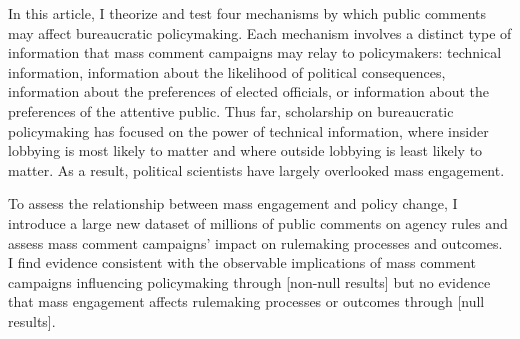 \documentclass{article}
\begin{document}
In this article, I theorize and test four mechanisms by which public comments may affect bureaucratic policymaking. Each mechanism involves a distinct type of information that mass comment campaigns may relay to policymakers: technical information, information about the likelihood of political consequences, information about the preferences of elected officials, or information about the preferences of the attentive public. Thus far, scholarship on bureaucratic policymaking has focused on the power of technical information, where insider lobbying is most likely to matter and where outside lobbying is least likely to matter. As a result, political scientists have largely overlooked mass engagement.

To assess the relationship between mass engagement and policy change, I introduce a large new dataset of millions of public comments on agency rules and assess mass comment campaigns' impact on rulemaking processes and outcomes. %
I find evidence consistent with the observable implications of mass comment campaigns influencing policymaking through [non-null results] but no evidence that mass engagement affects rulemaking processes or outcomes through [null results].


\singlespace
\small
 

\end{document}

